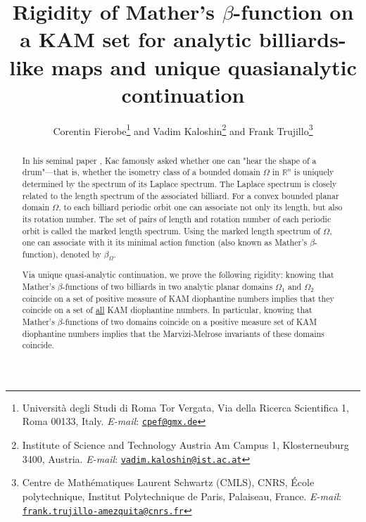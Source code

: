 \documentclass[10pt]{article}
\date{}
\begin{document}
\title{Rigidity of Mather's $\beta$-function on a KAM set for analytic billiards-like maps and unique quasianalytic continuation}
\author[1]{Corentin Fierobe\thanks{Università degli Studi di Roma Tor Vergata, Via della Ricerca Scientifica 1, Roma 00133, Italy.
    \textit{E-mail}: \href{cpef@gmx.de}{\texttt{cpef@gmx.de}}}\hspace{2mm} 
and Vadim Kaloshin\thanks{Institute of Science and Technology Austria
   Am Campus 1, Klosterneuburg 3400, Austria.
    \textit{E-mail}: \href{vadim.kaloshin@ist.ac.at}{\texttt{vadim.kaloshin@ist.ac.at}}}\hspace{2mm} 
and Frank Trujillo\thanks{Centre de Mathématiques Laurent Schwartz (CMLS), CNRS, École polytechnique, Institut Polytechnique de Paris, Palaiseau, France.
    \textit{E-mail}: \href{frank.trujillo-amezquita@cnrs.fr}{\texttt{frank.trujillo-amezquita@cnrs.fr}}}}

\date{} 



\maketitle

\begin{abstract}
    In his seminal paper \cite{Kac}, Kac famously asked whether one can "hear the shape of a drum"—that is, whether the isometry class of a bounded domain $\Omega$ in $\mathbb R^n$ is uniquely determined by the spectrum of its Laplace spectrum. The Laplace spectrum is closely related to the length spectrum of the associated billiard. For a convex bounded planar domain $\Omega$, to each billiard periodic orbit one can associate not only its length, but also its rotation number. The set of pairs of length and rotation number of each periodic orbit is called the marked length spectrum. Using the marked length spectrum of $\Omega$, one can associate with it its minimal action function (also known as Mather’s $\beta$-function), denoted by $\beta_\Omega$.

Via unique quasi-analytic continuation, we prove the following rigidity: knowing that Mather’s $\beta$-functions of two billiards in two analytic planar domains $\Omega_1$ and $\Omega_2$ coincide on a set of positive measure of KAM diophantine numbers implies that they coincide on a set of \underline{all} KAM diophantine numbers. 
In particular, knowing that Mather’s $\beta$-functions of two domains coincide
on a positive measure set of KAM diophantine numbers implies that the Marvizi-Melrose invariants of these domains coincide. 
\end{abstract}
\end{document}
